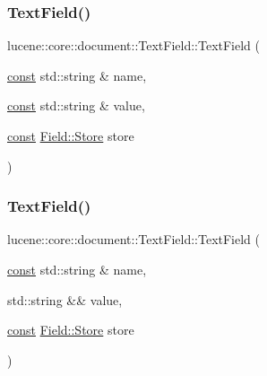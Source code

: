\mbox{\label{classlucene_1_1core_1_1document_1_1TextField_a240a22520ea651981c9ee78d5e3bc5d8}} 
\subsubsection{\texorpdfstring{Text\+Field()}{TextField()}\hspace{0.1cm}{\footnotesize\ttfamily [2/4]}}
{\footnotesize\ttfamily lucene\+::core\+::document\+::\+Text\+Field\+::\+Text\+Field (\begin{DoxyParamCaption}\item[{\mbox{\hyperlink{ZlibCrc32_8h_a2c212835823e3c54a8ab6d95c652660e}{const}} std\+::string \&}]{name,  }\item[{\mbox{\hyperlink{ZlibCrc32_8h_a2c212835823e3c54a8ab6d95c652660e}{const}} std\+::string \&}]{value,  }\item[{\mbox{\hyperlink{ZlibCrc32_8h_a2c212835823e3c54a8ab6d95c652660e}{const}} \mbox{\hyperlink{classlucene_1_1core_1_1document_1_1Field_a7d5d79f0c56d3548ab8d46d0e7dae35d}{Field\+::\+Store}}}]{store }\end{DoxyParamCaption})\hspace{0.3cm}{\ttfamily [inline]}}

\mbox{\label{classlucene_1_1core_1_1document_1_1TextField_a7cf6397f05d45eda68c7ff78518e0cac}} 
\subsubsection{\texorpdfstring{Text\+Field()}{TextField()}\hspace{0.1cm}{\footnotesize\ttfamily [3/4]}}
{\footnotesize\ttfamily lucene\+::core\+::document\+::\+Text\+Field\+::\+Text\+Field (\begin{DoxyParamCaption}\item[{\mbox{\hyperlink{ZlibCrc32_8h_a2c212835823e3c54a8ab6d95c652660e}{const}} std\+::string \&}]{name,  }\item[{std\+::string \&\&}]{value,  }\item[{\mbox{\hyperlink{ZlibCrc32_8h_a2c212835823e3c54a8ab6d95c652660e}{const}} \mbox{\hyperlink{classlucene_1_1core_1_1document_1_1Field_a7d5d79f0c56d3548ab8d46d0e7dae35d}{Field\+::\+Store}}}]{store }\end{DoxyParamCaption})\hspace{0.3cm}{\ttfamily [inline]}}

